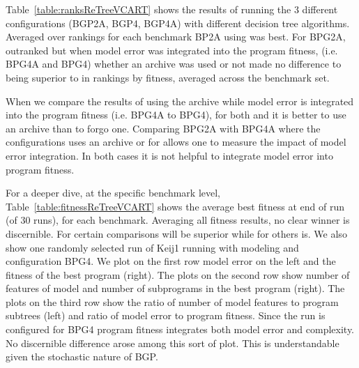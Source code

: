Table~\ref{table:ranksReTreeVCART} shows the results of running the 3 different configurations (BGP2A, BGP4, BGP4A) with different decision tree algorithms.  Averaged over rankings for each benchmark  BP2A using \REPTREE was best. For BPG2A, \REPTREE outranked \SCIKIT but when model error was integrated into the program fitness, (i.e. BPG4A and BPG4) whether an archive was used or not made no difference to \SCIKIT being superior to \REPTREE  in rankings by fitness, averaged across the benchmark set.  

When we compare the results of using the archive while model error is integrated into the program fitness (i.e.  BPG4A to BPG4), for both \REPTREE and \SCIKIT it is better to use an archive than to forgo one.  Comparing BPG2A with BPG4A where the configurations uses an archive \SCIKIT or for \REPTREE allows one to measure the impact of model error integration.  In both cases it is not helpful to integrate model error into program fitness. 

For a deeper dive, at the specific benchmark level, Table~\ref{table:fitnessReTreeVCART} shows the average best fitness at end of run (of 30 runs), for each benchmark.   Averaging all fitness results, no clear winner is  discernible. For certain comparisons \SCIKIT will be superior while for others \REPTREE is.   We also show one randomly selected run of Keij1 running with \REPTREE modeling and configuration BPG4.   We plot on the first row  model error on the left and the fitness of the best program (right).  The plots on the second row show number of features of model  and number of subprograms in the best program (right). The plots on the third row show the ratio of number of model features to program subtrees (left) and ratio of model error to program fitness. Since the run is configured for  BPG4 program fitness integrates both model error and complexity.  No discernible difference arose among this sort of plot. This is understandable given the stochastic nature of BGP.



